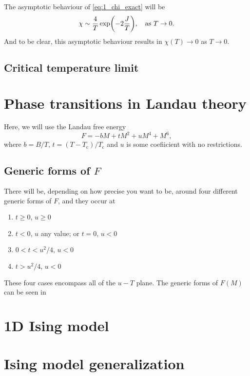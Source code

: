 \documentclass[11pt,letter, swedish, english
]{article}
\newcommand{\Tc}{\ensuremath{T_{\text{c}}}}
\begin{document}
The asymptotic behaviour of \eqref{eq:1_chi_exact} will be 
\begin{equation}
\chi\sim \frac{4}{T}\exp(-2\frac{J}{T})
\qcomma \text{as}\ T\to0.
\end{equation}
And to be clear, this asymptotic behaviour results in $\chi(T)\to0$ as
$T\to0$. 


\subsection{Critical temperature limit}






\section{Phase transitions in Landau theory}
\renewcommand{\thesubsection}{\arabic{section} (\alph{subsection})}
\renewcommand{\thesubsubsection}{\arabic{section} (\alph{subsection},\,\roman{subsubsection})}

Here, we will use the Landau free energy
\begin{equation}
F=-bM+tM^2+uM^4+M^6,
\end{equation}
where $b=B/T$, $t=(T-\Tc)/\Tc$ and $u$ is some coefiicient with no
restrictions. 

\subsection{Generic forms of $F$}
There will be, depending on how precise you want to be, around four
different generic forms of $F$, and they occur at
\begin{enumerate}[label=\Roman*.]
\item $t\ge0$, $u\ge0$ %
\item $t<0$, $u$ any value; or $t=0$, $u<0$
\item $0<t<u^2/4$, $u<0$
\item $t>u^2/4$, $u<0$
\end{enumerate}
These four cases encompass all of the $u{-}T$ plane. The generic forms
of $F(M)$ can be seen in 

\begin{figure}
\centering

\caption{}
\label{fig:2a}
\end{figure}







\section{1D Ising model}



\section{Ising model generalization}
\end{document}
